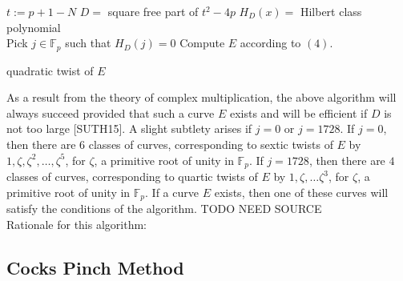 \documentclass[12pt,twoside]{article}
\begin{document}
\begin{algorithm}[H]
 $t := p+1 - N$\; 
 $D = $ square free part of $t^2-4p$\;
 $H_D(x) = $ Hilbert class polynomial \\
 Pick $j \in \mathbb F_p$ such that $H_D(j) = 0$
 Compute $E$ according to $(4)$.
 
  {
 }
 {\Return quadratic twist of $E$}
 \end{algorithm}
 \bigskip
 

 
 
 
 
 
 
\noindent As a result from the theory of complex multiplication, the above algorithm will always succeed provided that such a curve $E$ exists and will be efficient if $D$ is not too large [SUTH15]. A slight subtlety arises if $j = 0$ or $j = 1728$. If $j = 0$, then there are $6$ classes of curves, corresponding to sextic twists of $E$ by $1, \zeta, \zeta^2, \dots, \zeta^5$, for $\zeta$, a primitive root of unity in $\mathbb F_p$. If $j = 1728$, then there are $4$ classes of curves, corresponding to quartic twists of $E$ by $1, \zeta, \dots \zeta^3$, for $\zeta$, a primitive root of unity in $\mathbb F_p$. If a curve $E$ exists, then one of these curves will satisfy the conditions of the algorithm. TODO NEED SOURCE
\\ 
Rationale for this algorithm: 

\subsection{Cocks Pinch Method}
\end{document}
